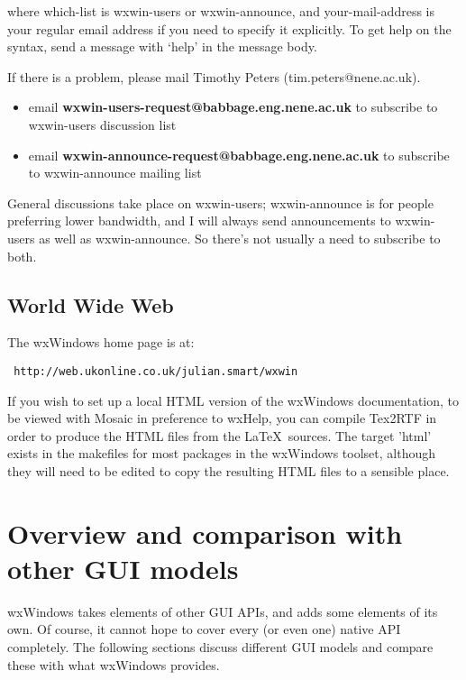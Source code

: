 where which-list is wxwin-users or wxwin-announce, and your-mail-address
is your regular email address if you need to specify it explicitly. To
get help on the syntax, send a message with `help' in the message body.

If there is a problem, please mail Timothy Peters (tim.peters@nene.ac.uk).

\begin{itemize}\itemsep=0pt
\item email {\bf wxwin-users-request@babbage.eng.nene.ac.uk} to subscribe to wxwin-users discussion list
\item email {\bf wxwin-announce-request@babbage.eng.nene.ac.uk} to subscribe to wxwin-announce mailing list
\end{itemize}

General discussions take place on wxwin-users; wxwin-announce is for
people preferring lower bandwidth, and I will always send announcements
to wxwin-users as well as wxwin-announce.  So there's not usually a need
to subscribe to both.

\section{World Wide Web}

The wxWindows home page is at:

\begin{verbatim}
 http://web.ukonline.co.uk/julian.smart/wxwin
\end{verbatim}

If you wish to set up a local HTML version of the wxWindows
documentation, to be viewed with Mosaic in preference to wxHelp, you can
compile Tex2RTF in order to produce the HTML files from the \LaTeX\ sources.
The target 'html' exists in the makefiles for most packages in the wxWindows
toolset, although they will need to be edited to copy the resulting HTML
files to a sensible place.

%
\chapter{Overview and comparison with other GUI models}\label{comparison}
%
\setfooter{\thepage}{}{}{}{}{\thepage}%

wxWindows takes elements of other GUI APIs, and adds some elements of
its own.  Of course, it cannot hope to cover every (or even one) native
API completely.  The following sections discuss different GUI models
and compare these with what wxWindows provides.

